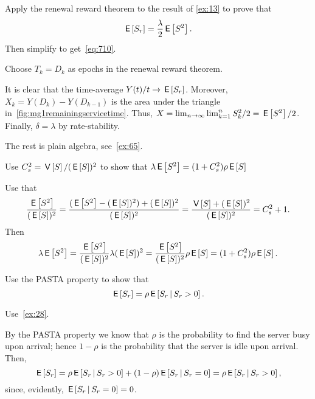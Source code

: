 \begin{exercise}
Apply the renewal reward theorem to the result of \cref{ex:13} to prove that 
\begin{equation}\label{eq:34}
\,\mathsf{E}\left[S_r\right] = \frac{\lambda}2 \,\mathsf{E}\left[S^2\right]. 
\end{equation}
Then simplify to get~\cref{eq:710}. 
\begin{hint}
  Choose $T_k=D_k$ as epochs in the renewal reward theorem.
\end{hint}
\begin{solution}
  It is clear that the time-average $Y(t)/t \to \,\mathsf{E}\left[S_r\right]$.
  Moreover, $X_k = Y(D_k) - Y(D_{k-1})$ is the area under the triangle in~\cref{fig:mg1remainingservicetime}.
  Thus, $X=\lim_{n\to\infty} \lim_{k=1}^n S_k^2/ 2 = \,\mathsf{E}\left[S^2\right]/2$.
  Finally, $\delta = \lambda$ by rate-stability.

  The rest is plain algebra, see~\cref{ex:65}.
\end{solution}
\end{exercise}

\begin{extra}\label{ex:65}
Use $C_s^2 = \,\mathsf{V}\left[S\right] / (\,\mathsf{E}\left[S\right])^2$ to show that $\lambda \,\mathsf{E}\left[S^2\right] = (1+C_s^2)\rho\,\mathsf{E}\left[S\right]$
\begin{solution}
Use that 
\begin{equation*}
  \frac{\,\mathsf{E}\left[S^2\right]}{(\,\mathsf{E}\left[S\right])^2} = 
  \frac{(\,\mathsf{E}\left[S^2\right]-(\,\mathsf{E}\left[S\right])^2) + (\,\mathsf{E}\left[S\right])^2}{(\,\mathsf{E}\left[S\right])^2} =
  \frac{\,\mathsf{V}\left[S\right] + (\,\mathsf{E}\left[S\right])^2}{(\,\mathsf{E}\left[S\right])^2} =
  C_s^2 + 1.
\end{equation*}
Then
\begin{equation*}
  \lambda\,\mathsf{E}\left[S^2\right] = \frac{\,\mathsf{E}\left[S^2\right]}{(\,\mathsf{E}\left[S\right])^2} \lambda(\,\mathsf{E}\left[S\right])^2=
 \frac{\,\mathsf{E}\left[S^2\right]}{(\,\mathsf{E}\left[S\right])^2} \rho \,\mathsf{E}\left[S\right] = (1+C_s^2) \rho \,\mathsf{E}\left[S\right].
\end{equation*}
\end{solution}
\end{extra}



\begin{extra}
Use  the PASTA property to show that
\begin{equation}\label{eq:37}
\,\mathsf{E}\left[S_r\right] =  \rho \,\mathsf{E}\left[S_r\,\middle|\, S_r>0\right].
\end{equation}
\begin{hint}
  Use~\cref{ex:28}.
\end{hint}
\begin{solution}
By the PASTA property we know that $\rho$ is  the probability to find the server busy upon arrival; hence $1- \rho$ is the probability that the server is idle upon arrival. Then,
\begin{equation*}
\,\mathsf{E}\left[S_r\right] =   \rho \,\mathsf{E}\left[S_r\,\middle|\, S_r >0\right] + (1-\rho) \,\mathsf{E}\left[S_r\,\middle|\, S_r = 0\right] = \rho \,\mathsf{E}\left[S_r\,\middle|\, S_r>0\right],
\end{equation*}
since, evidently, $\,\mathsf{E}\left[S_r\,\middle|\, S_r=0\right]=0$.  
\end{solution}
\end{extra}

